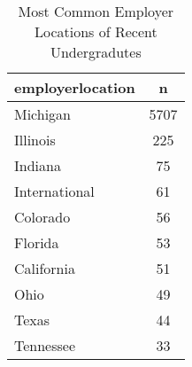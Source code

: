 \documentclass{article}
\begin{document}
\begin{table}[ht]
\centering
\begin{tabular}{lc}
  \hline
  employerlocation & n \\ 
  \hline
  Michigan & 5707 \\ 
  Illinois & 225 \\ 
  Indiana &  75 \\ 
  International &  61 \\ 
  Colorado &  56 \\ 
  Florida &  53 \\ 
  California &  51 \\ 
  Ohio &  49 \\ 
  Texas &  44 \\ 
  Tennessee &  33 \\ 
   \hline
\end{tabular}
\caption*{Most Common Employer Locations of Recent Undergradutes} 
\end{table}
\end{document}
